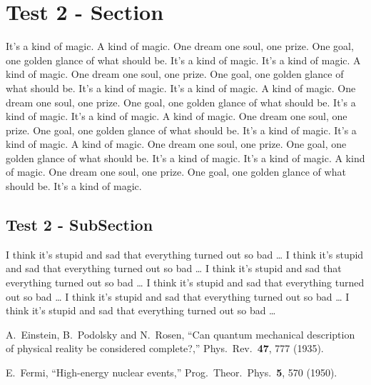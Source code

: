 \documentclass[12pt,twoside]{report}
\begin{document}
\section{Test 2 - Section}

It's a kind of magic.  A kind of magic.  One dream one soul, one prize.
One goal, one golden glance of what should be.  It's a kind of magic.
It's a kind of magic.  A kind of magic.  One dream one soul, one prize.
One goal, one golden glance of what should be.  It's a kind of magic.
It's a kind of magic.  A kind of magic.  One dream one soul, one prize.
One goal, one golden glance of what should be.  It's a kind of magic.
It's a kind of magic.  A kind of magic.  One dream one soul, one prize.
One goal, one golden glance of what should be.  It's a kind of magic.
It's a kind of magic.  A kind of magic.  One dream one soul, one prize.
One goal, one golden glance of what should be.  It's a kind of magic.
It's a kind of magic.  A kind of magic.  One dream one soul, one prize.
One goal, one golden glance of what should be.  It's a kind of magic.

\subsection{Test 2 - SubSection}

I think it's stupid and sad that everything turned out so bad \dots
I think it's stupid and sad that everything turned out so bad \dots
I think it's stupid and sad that everything turned out so bad \dots
I think it's stupid and sad that everything turned out so bad \dots
I think it's stupid and sad that everything turned out so bad \dots
I think it's stupid and sad that everything turned out so bad \dots


%
%
%
\begin{thebibliography}{99}

  A.~Einstein, B.~Podolsky and N.~Rosen,
  ``Can quantum mechanical description of physical reality be considered
  complete?,''
  Phys.\ Rev.\  {\bf 47}, 777 (1935).

  E.~Fermi,
  ``High-energy nuclear events,''
  Prog.\ Theor.\ Phys.\  {\bf 5}, 570 (1950).

\end{thebibliography}
\end{document}
